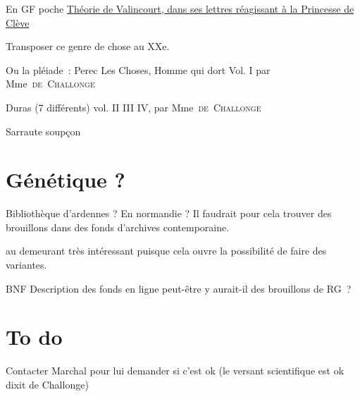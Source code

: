\documentclass[12pt, a4paper]{article}
\begin{document}
En GF poche \href{https://www.lalibrairie.com/livres/lettres-a-madame-la-marquise-sur-le-sujet-de-la-princesse-de-cleves_0-60674_9782080711144.html}{Théorie de Valincourt, dans ses lettres réagissant à la Princesse de Clève}

Transposer ce genre de chose au XXe.

Ou la pléiade~:
Perec Les Choses, Homme qui dort Vol. I par Mme~\textsc{de~Challonge}

Duras (7 différents) vol. II III IV, par Mme~\textsc{de~Challonge}

Sarraute soupçon


\section{Génétique ?}
Bibliothèque d'ardennes ? En normandie ?
Il faudrait pour cela  trouver des brouillons dans des fonds d'archives contemporaine. 

au demeurant très intéressant puisque cela ouvre la possibilité de faire des variantes.

BNF 
Description des fonds en ligne peut-être y aurait-il des brouillons de RG~?




\section{To do}
Contacter Marchal pour lui demander si c'est ok (le versant scientifique est ok dixit de Challonge) 
\end{document}
